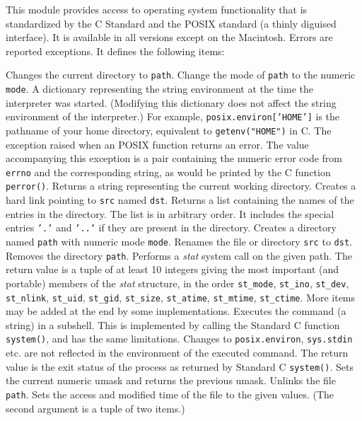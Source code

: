 This module provides access to operating system functionality that is
standardized by the C Standard and the POSIX standard (a thinly diguised
{\UNIX} interface).
It is available in all {\Python} versions except on the Macintosh.
Errors are reported exceptions.
It defines the following items:
\begin{description}
Changes the current directory to
{\tt path}.
Change the mode of
{\tt path}
to the numeric
{\tt mode}.
A dictionary representing the string environment at the time
the interpreter was started.
(Modifying this dictionary does not affect the string environment of the
interpreter.)
For example,
{\tt posix.environ['HOME']}
is the pathname of your home directory, equivalent to
{\tt getenv("HOME")}
in C.
The exception raised when an POSIX function returns an error.
The value accompanying this exception is a pair containing the numeric
error code from
{\tt errno}
and the corresponding string, as would be printed by the C function
{\tt perror()}.
Returns a string representing the current working directory.
Creates a hard link pointing to
{\tt src}
named
{\tt dst}.
Returns a list containing the names of the entries in the
directory.
The list is in arbitrary order.
It includes the special entries
{\tt '.'}
and
{\tt '..'}
if they are present in the directory.
Creates a directory named
{\tt path}
with numeric mode
{\tt mode}.
Renames the file or directory
{\tt src}
to
{\tt dst}.
Removes the directory
{\tt path}.
Performs a
{\em stat}
system call on the given path.
The return value is a tuple of at least 10 integers giving the most
important (and portable) members of the
{\em stat}
structure, in the order
{\tt st\_mode},
{\tt st\_ino},
{\tt st\_dev},
{\tt st\_nlink},
{\tt st\_uid},
{\tt st\_gid},
{\tt st\_size},
{\tt st\_atime},
{\tt st\_mtime},
{\tt st\_ctime}.
More items may be added at the end by some implementations.
Executes the command (a string) in a subshell.
This is implemented by calling the Standard C function
{\tt system()},
and has the same limitations.
Changes to
{\tt posix.environ},
{\tt sys.stdin}
etc. are not reflected in the environment of the executed command.
The return value is the exit status of the process as returned by
Standard C
{\tt system()}.
Sets the current numeric umask and returns the previous umask.
Unlinks the file
{\tt path}.
Sets the access and modified time of the file to the given values.
(The second argument is a tuple of two items.)
\end{description}


